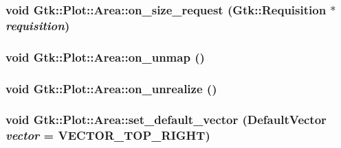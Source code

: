 \label{classGtk_1_1Plot_1_1Area_a29ff37fa1a94277109a514bcbf90ac16}
\hypertarget{classGtk_1_1Plot_1_1Area_a839dd99ca3281e3f6b7c669af54d1393}{
\subsubsection[{on\_\-size\_\-request}]{\setlength{\rightskip}{0pt plus 5cm}void Gtk::Plot::Area::on\_\-size\_\-request (Gtk::Requisition $\ast$ {\em requisition})}}
\label{classGtk_1_1Plot_1_1Area_a839dd99ca3281e3f6b7c669af54d1393}
\hypertarget{classGtk_1_1Plot_1_1Area_a67389087dd5c6467a3ae9241521f80bf}{
\subsubsection[{on\_\-unmap}]{\setlength{\rightskip}{0pt plus 5cm}void Gtk::Plot::Area::on\_\-unmap ()}}
\label{classGtk_1_1Plot_1_1Area_a67389087dd5c6467a3ae9241521f80bf}
\hypertarget{classGtk_1_1Plot_1_1Area_a301b7923090d5b717d3112fc339dce01}{
\subsubsection[{on\_\-unrealize}]{\setlength{\rightskip}{0pt plus 5cm}void Gtk::Plot::Area::on\_\-unrealize ()}}
\label{classGtk_1_1Plot_1_1Area_a301b7923090d5b717d3112fc339dce01}
\hypertarget{classGtk_1_1Plot_1_1Area_a98008d5f8c7cdf2eeaa96f13b2ae55ce}{
\subsubsection[{set\_\-default\_\-vector}]{\setlength{\rightskip}{0pt plus 5cm}void Gtk::Plot::Area::set\_\-default\_\-vector ({\bf DefaultVector} {\em vector} = {\ttfamily VECTOR\_\-TOP\_\-RIGHT})}}
\label{classGtk_1_1Plot_1_1Area_a98008d5f8c7cdf2eeaa96f13b2ae55ce}


